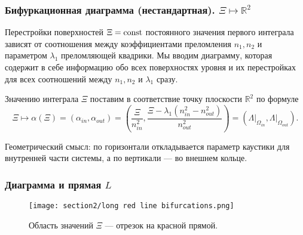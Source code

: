 \begin{frame}\frametitle{Бифуркационная диаграмма (нестандартная).  $\Xi \mapsto \mathbb{R}^2$}
\qq Перестройки поверхностей $\Xi = \mathrm{const}$ постоянного значения первого интеграла зависят от соотношения между коэффициентами преломления $n_1, n_2$ и параметром  $\lambda_1$ преломляющей квадрики. Мы вводим диаграмму, которая содержит в себе информацию обо всех поверхностях уровня и их перестройках для всех соотношений между $n_1, n_2$ и $\lambda_1$ сразу.

\qq Значению интеграла $\Xi$ поставим в соответствие точку плоскости $\mathbb{R}^2$ по формуле
\begin{equation*}
\Xi \mapsto \alpha(\Xi) = (\alpha_{in}, \alpha_{out} ) = \left( \frac{\Xi}{n_{in}^2}, \frac{\Xi - \lambda_1 (n_{in}^2 - n_{out}^2)}{n_{out}^2} \right) = \left( \left. \Lambda \right|_{\Omega_{in}}, \left. \Lambda \right|_{\Omega_{out}} \right).
\label{XiToLine}
\end{equation*}

\qq Геометрический смысл: по горизонтали откладывается параметр каустики для внутренней части системы, а по вертикали --- во внешнем кольце.
\end{frame}

%
%
%
\begin{frame}\frametitle{Диаграмма и прямая $L$}
\begin{figure}[!htb]
\centering
\texttt{[image: section2/long red line bifurcations.png]}
    \caption{Область значений $\Xi$ --- отрезок на красной прямой.}
    \label{fig:sect2_diagramPlusIrregular}
\end{figure}
\end{frame}


